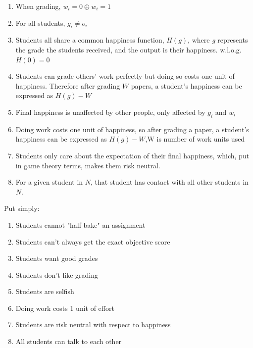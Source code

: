 \documentclass[12pt, Arial]{article}
\begin{document}
\begin{enumerate}
\item When grading, $w_i=0 \oplus w_i=1$
\item For all students, $g_i \neq o_i$
\item Students all share a common happiness function, $H(g)$, where \emph{g} represents the grade the students received, and the output is their happiness. w.l.o.g. $H(0)=0$
\item Students can grade others' work perfectly but doing so costs one unit of happiness. Therefore after grading $W$ papers, a student's happiness can be expressed as $H(g)-W$
\item Final happiness is unaffected by other people, only affected by $g_i$ and $w_i$
\item Doing work costs one unit of happiness, so after grading a paper, a student's happiness can be expressed as $H(g)-W$,W is number of work units used
\item Students only care about the expectation of their final happiness, which, put in game theory terms, makes them risk neutral.
\item For a given student in $N$, that student has contact with all other students in $N$.
\end{enumerate}
Put simply:
\begin{enumerate}
\item Students cannot "half bake" an assignment
\item Students can't always get the exact objective score
\item Students want good grades
\item Students don't like grading
\item Students are selfish
\item Doing work costs 1 unit of effort
\item Students are risk neutral with respect to happiness
\item All students can talk to each other
\end{enumerate}
\end{document}

